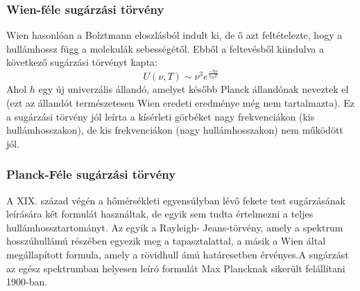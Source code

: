 \documentclass[a4paper,12pt]{article}
\begin{document}
\subsubsection{Wien-féle sugárzási törvény}
Wien hasonlóan a Bolztmann eloszlásból indult ki, de ő azt feltételezte, hogy a hullámhossz függ a molekulák sebességétől. Ebből a feltevésből kiindulva a következő sugárzási törvényt kapta:
\begin{equation}
    U(\nu, T) \sim \nu^3 e^{\frac{- h \nu}{k_BT}}
\end{equation}
Ahol $h$ egy új univerzális állandó, amelyet később Planck állandónak neveztek el (ezt az állandót természetesen Wien eredeti eredménye még nem tartalmazta). Ez a sugárzási törvény jól leírta a kísérleti görbéket nagy frekvenciákon (kis hullámhosszakon), de kis frekvenciákon (nagy hullámhosszakon) nem működött jól.

\subsubsection{Planck-Féle sugárzási törvény}
A XIX. század végén a hőmérsékleti egyensúlyban lévő fekete test sugárzásának leírására két formulát használtak, de egyik sem tudta értelmezni a teljes
hullámhossztartományt. Az egyik a Rayleigh- Jeans-törvény, amely a spektrum hosszúhullámú részében egyezik meg a tapasztalattal, a másik a Wien
által megállapított formula, amely a rövidhull ámú határesetben érvényes.A sugárzást az egész spektrumban helyesen leíró formulát Max Plancknak sikerült felállítani 1900-ban.
\end{document}
